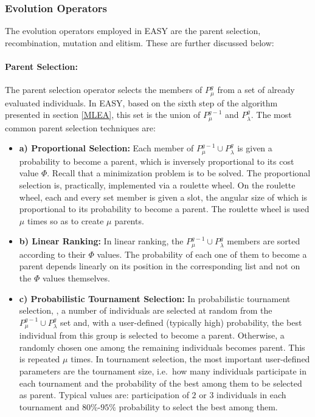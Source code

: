 \subsubsection{Evolution Operators}
\label{evOps}
The evolution operators employed in EASY are the parent selection,  recombination, mutation and  elitism. These are further discussed below: 
   
\paragraph{Parent Selection:}
The parent selection operator selects the members of $P_{\mu}^{g}$ from a set of already evaluated individuals. In EASY, based on the sixth step of the  algorithm presented in section \ref{MLEA}, this set is the union of $P_{\mu}^{g-1}$ and $P_{\lambda}^g$. The most common \cite{Back1996} parent selection techniques are: 
\begin{itemize}
\item[]{\bf a) Proportional Selection:} Each member of $P_{\mu}^{g-1} \cup P_{\lambda}^g$ is given a probability to become a parent, which is inversely proportional to its cost value $\Phi$. Recall that a minimization problem is to be solved. The proportional selection is, practically, implemented via a roulette wheel. On the roulette wheel, each and every set member is given a slot, the angular size of which is proportional to its probability to become a parent. The roulette wheel is used $\mu$ times so as to create $\mu$ parents.  
\item[]{\bf b) Linear Ranking:} In linear ranking, the $P_{\mu}^{g-1} \cup P_{\lambda}^g$ members are sorted according to their $\Phi$ values. The probability of each one of them to become a parent depends linearly on its position in the corresponding list and not on the $\Phi$ values themselves.
\item[]{\bf c) Probabilistic Tournament Selection:}
In probabilistic tournament selection, \cite{goldberg1991}, a number of individuals are selected at random from the $P_{\mu}^{g-1} \cup P_{\lambda}^g$ set and, with a user-defined (typically high) probability, the best individual from this group is selected to become a parent. Otherwise, a randomly chosen one among the remaining individuals becomes parent. This is repeated $\mu$ times. In tournament selection, the most important user-defined parameters are the tournament size, i.e.\ how many individuals participate in each tournament and the probability of the best among them to be selected as parent. Typical values are: participation of $2$ or $3$ individuals in each tournament and $80\%$-$95\%$ probability to select the best among them.
\end{itemize}


